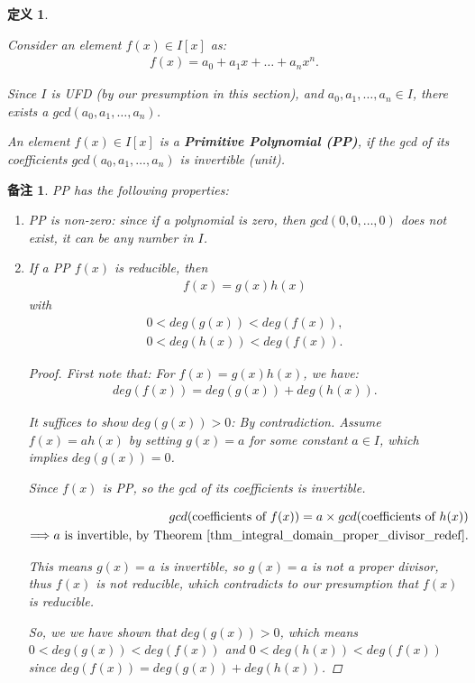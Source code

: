 \documentclass[utf8]{ctexbook}
\newtheorem{definition}{定义}[section]
\newtheorem{memo}{备注}[section]
\begin{document}
\begin{definition}
\label{def_poly_PP}

Consider an element $f(x) \in I[x]$ as:
\begin{align}
f(x) = a_0 + a_1 x + \ldots + a_n x^n . 
\end{align}

Since $I$ is UFD (by our presumption in this section), and $a_0, a_1, \ldots, a_n \in I$, there exists a $gcd(a_0, a_1, \ldots , a_n)$. 

An element $f(x) \in I[x]$ is a \textbf{Primitive Polynomial (PP)}, if the gcd of its coefficients $gcd(a_0, a_1, \ldots , a_n)$ is invertible (unit).
\end{definition}

\begin{memo}\label{memo_Factor_poly_ring_PP_property}
PP has the following properties:
\begin{enumerate}
\item{PP is non-zero: since if a polynomial is zero, then $gcd(0,0,\ldots,0)$ does not exist, it can be any number in $I$. \label{memo_Factor_poly_ring_PP_property_1}
}
\item{\label{memo_Factor_poly_ring_PP_property_2}
If a PP $f(x)$ is reducible, then
\begin{align}
f(x) = g(x) h(x)
\end{align}
with 
\begin{align*}
0 < deg(g(x)) < deg(f(x)), \\
0 < deg(h(x)) < deg(f(x)). 
\end{align*}

\begin{proof}
First note that: For $f(x) = g(x) h(x)$, we have:
\begin{align*}
deg(f(x)) = deg(g(x)) + deg(h(x)) .
\end{align*}

It suffices to show $deg(g(x)) > 0$: By contradiction. Assume $f(x) = a h(x)$ by setting $g(x) = a$ for some constant $a \in I$, which implies $deg(g(x)) = 0$.

Since $f(x)$ is PP, so the gcd of its coefficients is invertible.

\begin{align*}
gcd(\mbox{coefficients of } f(x)) = a \times gcd(\mbox{coefficients of } h(x) ) \\
\Longrightarrow a \mbox{ is invertible, by Theorem \ref{thm_integral_domain_proper_divisor_redef}}.
\end{align*}  

This means $g(x) = a$ is invertible, so $g(x)=a$ is not a proper divisor, thus $f(x)$ is not reducible, which contradicts to our presumption that $f(x)$ is reducible. 

So, we we have shown that $deg(g(x)) > 0$, which means $0 < deg(g(x)) < deg(f(x))$ and $0 < deg(h(x)) < deg(f(x))$ since $deg(f(x)) = deg(g(x)) + deg(h(x))$.

\end{proof}
}
\end{enumerate}
\end{memo}
\end{document}
